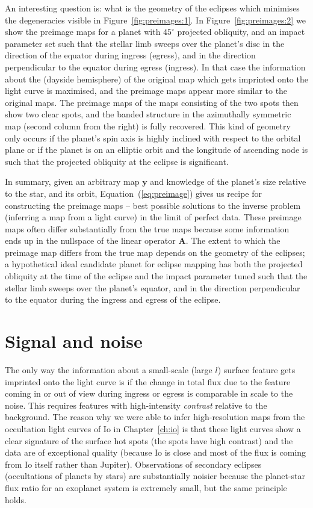 \documentclass[12pt,dvipsnames]{report}
\begin{document}
An interesting question is: what is the geometry of the eclipses which minimises
the degeneracies visible in Figure~\ref{fig:preimages:1}. In
Figure~\ref{fig:preimages:2} we show the preimage maps for a planet with
$45^\circ$ projected obliquity, and an impact parameter set such that the
stellar limb sweeps over the planet's disc in the direction of the equator
during ingress (egress), and in the direction perpendicular to the equator
during egress (ingress). In that case the information about the (dayside
hemisphere) of the original map which gets imprinted onto the light curve is
maximised, and the preimage maps appear more similar to the original maps. The
preimage maps of the maps consisting of the two spots then show two clear spots, and
the banded structure in the azimuthally symmetric map (second column from the
right) is fully recovered. This kind of geometry only occurs if the planet's
spin axis is highly inclined with respect to the orbital plane or if the planet
is on an elliptic orbit and the longitude of ascending node is such that the
projected obliquity at the eclipse is significant. 

In summary, given an arbitrary map $\mathbf{y}$ and knowledge of the planet's
size relative to the star, and its orbit, Equation~(\ref{eq:preimage}) gives us
recipe for constructing the preimage maps -- best possible solutions to the
inverse problem (inferring a map from a light curve) in the limit of perfect
data. These preimage maps often differ substantially  from the true maps because
some information ends up in the nullspace of the linear operator $\mathbf{A}$.
The extent to which the preimage map differs from the true map depends on the
geometry of the eclipses; a hypothetical ideal candidate planet for eclipse
mapping has both the projected obliquity at the time of the eclipse and the impact
parameter tuned such that the stellar limb sweeps over the planet's equator, and
in the direction perpendicular to the equator during the ingress and egress of
the eclipse.

\section{Signal and noise}
\label{sec:exo_signal_noise}
The only way the information about a small-scale (large $l$) surface feature gets 
imprinted onto the light curve is if the change in total flux due to the feature coming 
in or out of view during ingress or egress is comparable in scale to the noise.
This requires features with high-intensity \emph{contrast} relative to the background.
The reason why we were able to infer high-resolution maps  from the occultation light 
curves of Io in Chapter~\ref{ch:io} is that these light curves show a clear 
signature of the surface hot spots (the spots have high contrast) and the data are of 
exceptional quality (because Io is close and most of the flux is coming from Io itself 
rather than Jupiter).
Observations of secondary eclipses (occultations of planets by stars) are substantially
noisier because the planet-star flux ratio for an exoplanet system is extremely small,
but the same principle holds.
\end{document}
